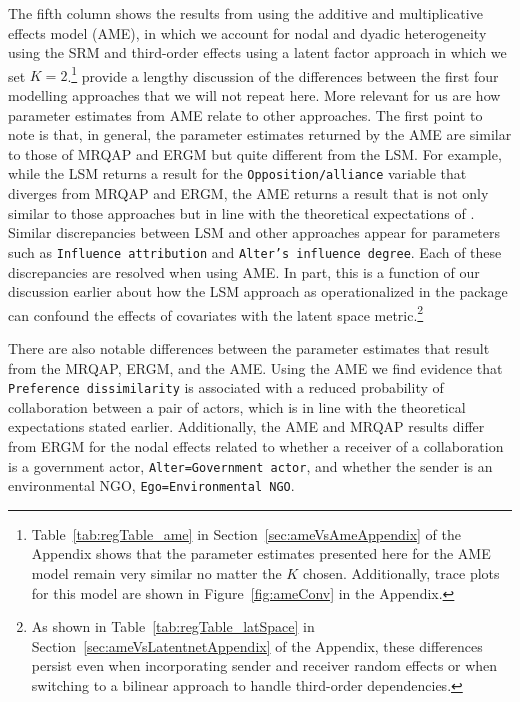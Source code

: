 The fifth column shows the results from using the additive and multiplicative effects model (AME), in which we account for nodal and dyadic heterogeneity using the SRM and third-order effects using a latent factor approach in which we set $K=2$.\footnote{Table~\ref{tab:regTable_ame} in Section~\ref{sec:ameVsAmeAppendix} of the Appendix shows that the parameter estimates presented here for the AME model remain very similar no matter the $K$ chosen. Additionally, trace plots for this model are shown in Figure~\ref{fig:ameConv} in the Appendix.} \citet{cranmer:etal:2016} provide a lengthy discussion of the differences between the first four modelling approaches that we will not repeat here. More relevant for us are how parameter estimates from AME relate to other approaches. The first point to note is that, in general, the parameter estimates returned by the AME are similar to those of MRQAP and ERGM but quite different from the LSM. For example, while the LSM returns a result for the \texttt{Opposition/alliance} variable that diverges from MRQAP and ERGM, the AME returns a result that is not only similar to those approaches but in line with the theoretical expectations of \citet{ingold:fischer:2014}. Similar discrepancies between LSM and other approaches appear for parameters such as \texttt{Influence attribution} and \texttt{Alter's influence degree}. Each of these discrepancies are resolved when using AME. In part, this is a function of our discussion earlier about how the LSM approach as operationalized in the  package can confound the effects of covariates with the latent space metric.\footnote{As shown in Table~\ref{tab:regTable_latSpace} in Section~\ref{sec:ameVsLatentnetAppendix} of the Appendix, these differences persist even when incorporating sender and receiver random effects or when switching to a bilinear approach to handle third-order dependencies.} %


\FloatBarrier

There are also notable differences between the parameter estimates that result from the MRQAP, ERGM, and the AME. Using the AME we find evidence that \texttt{Preference dissimilarity} is associated with a reduced probability of collaboration between a pair of actors, which is in line with the theoretical expectations stated earlier. Additionally, the AME and MRQAP results differ from ERGM for the nodal effects related to whether a receiver of a collaboration is a government actor, \texttt{Alter=Government actor}, and whether the sender is an environmental NGO, \texttt{Ego=Environmental NGO}.

